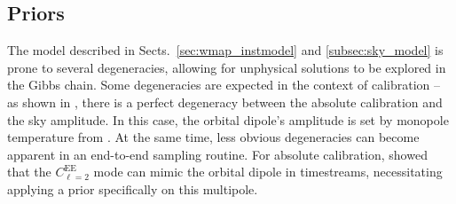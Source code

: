 \documentclass[twocolumn]{../../common/aa}
\def\WMAP{\emph{WMAP}}
\begin{document}


\subsection{Priors}
\label{sec:priors}


The model described in Sects.~\ref{sec:wmap_instmodel} and \ref{subsec:sky_model} is prone to several degeneracies, allowing for unphysical solutions to be explored in the Gibbs chain. Some degeneracies are expected in the context of calibration -- as shown in \citet{bp07}, there is a perfect degeneracy between the absolute calibration and the sky amplitude. In this case, the orbital dipole's amplitude is set by monopole temperature from \citet{fixsen2009}. At the same time, less obvious degeneracies can become apparent in an end-to-end sampling routine. For absolute calibration, \citet{bp07} showed that the $C_{\ell=2}^\mathrm{EE}$ mode can mimic the orbital dipole in timestreams, necessitating applying a prior specifically on this multipole.
\end{document}
